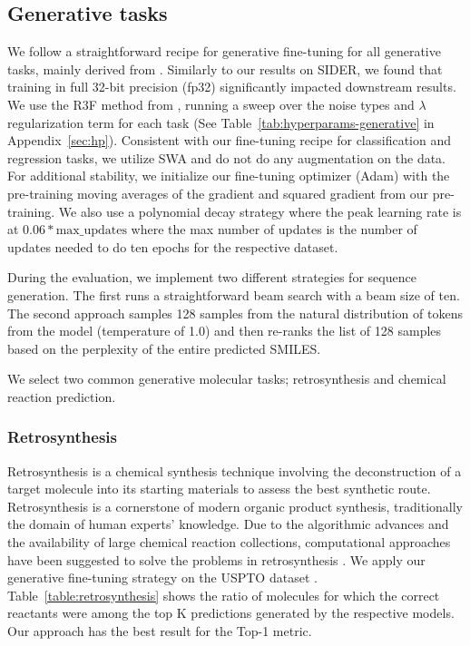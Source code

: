 \documentclass{article} %
\begin{document}
\subsection{Generative tasks}
We follow a straightforward recipe for generative fine-tuning for all generative tasks, mainly derived from \citet{RXF}. Similarly to our results on SIDER, we found that training in full 32-bit precision (fp32) significantly impacted downstream results. We use the R3F method from \citet{RXF}, running a sweep over the noise types and $\lambda$ regularization term for each task (See Table~\ref{tab:hyperparams-generative} in Appendix~\ref{sec:hp}). Consistent with our fine-tuning recipe for classification and regression tasks, we utilize SWA and do not do any augmentation on the data. For additional stability, we initialize our fine-tuning optimizer (Adam) with the pre-training moving averages of the gradient and squared gradient from our pre-training. We also use a polynomial decay strategy where the peak learning rate is at $0.06*\text{max\_updates}$ where the max number of updates is the number of updates needed to do ten epochs for the respective dataset.

During the evaluation, we implement two different strategies for sequence generation. The first runs a straightforward beam search with a beam size of ten. The second approach samples 128 samples from the natural distribution of tokens from the model (temperature of 1.0) and then re-ranks the list of 128 samples based on the perplexity of the entire predicted SMILES.

We select two common generative molecular tasks; retrosynthesis and chemical reaction prediction.
\subsubsection{Retrosynthesis}
Retrosynthesis is a chemical synthesis technique involving the deconstruction of a target molecule into its starting materials to assess the best synthetic route. Retrosynthesis is a cornerstone of modern organic product synthesis, traditionally the domain of human experts' knowledge. Due to the algorithmic advances and the availability of large chemical reaction collections, computational approaches have been suggested to solve the problems in retrosynthesis \citep{davey2018retrosynthesis,watson2019retrosynthetic}. We apply our generative fine-tuning strategy on the USPTO dataset \citep{lowe-USPTO-2012}. Table~\ref{table:retrosynthesis} shows the ratio of molecules for which the correct reactants were among the top K predictions generated by the respective models. Our approach has the best result for the Top-1 metric.
\end{document}
